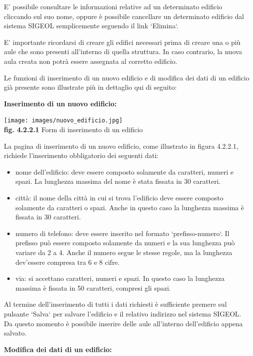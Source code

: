 \documentclass[11pt,a4paper]{article}
\begin{document}
E' possibile consultare le informazioni relative ad un determinato edificio cliccando sul suo nome, oppure è possibile cancellare un determinato edificio dal sistema SIGEOL semplicemente seguendo il link `Elimina`.

E' importante ricordarsi di creare gli edifici necessari prima di creare una o più aule che sono presenti all'interno di quella struttura. In caso contrario, la nuova aula creata non potrà essere assegnata al corretto edificio.

Le funzioni di inserimento di un nuovo edificio e di modifica dei dati di un edificio già presente sono illustrate più in dettaglio qui di seguito:
\newline \newline
\begin{large}\textbf{Inserimento di un nuovo edificio:}\end{large}

\begin{center}
	\texttt{[image: images/nuovo\_edificio.jpg]}\\
	\textbf{fig. 4.2.2.1} Form di inserimento di un edificio\\
\end{center}

La pagina di inserimento di un nuovo edificio, come illustrato in figura 4.2.2.1, richiede l'inserimento obbligatorio dei seguenti dati:
\begin{itemize}
 \item nome dell'edificio: deve essere composto solamente da caratteri, numeri e spazi. La lunghezza massima del nome è stata fissata in 30 caratteri.
 \item città: il nome della città in cui si trova l'edificio deve essere composto solamente da caratteri o spazi. Anche in questo caso la lunghezza massima è fissata in 30 caratteri.
 \item numero di telefono: deve essere inserito nel formato `prefisso-numero`. Il prefisso può essere composto solamente da numeri e la sua lunghezza può variare da 2 a 4. Anche il numero segue le stesse regole, ma la lunghezza dev'essere compresa tra 6 e 8 cifre.
 \item via: si accettano caratteri, numeri e spazi. In questo caso la lunghezza massima è fissata in 50 caratteri, compresi gli spazi.
\end{itemize}
Al termine dell'inserimento di tutti i dati richiesti è sufficiente premere sul pulsante `Salva` per salvare l'edificio e il relativo indirizzo nel sistema SIGEOL.
Da questo momento è possibile inserire delle aule all'interno dell'edificio appena salvato.
\newpage
\begin{large}\textbf{Modifica dei dati di un edificio:}\end{large}
\end{document}
